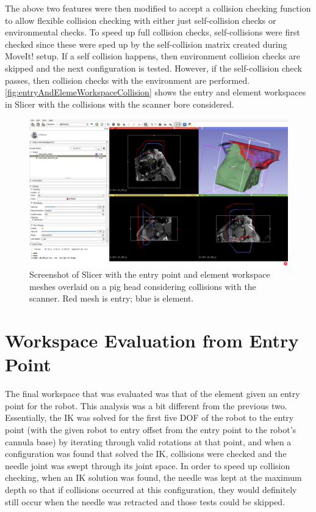 \documentclass[12pt]{report}
\begin{document}
The above two features were then modified to accept a collision checking function to allow flexible collision checking with either just self-collision checks or environmental checks. To speed up full collision checks, self-collisions were first checked since these were sped up by the self-collision matrix created during MoveIt! setup. If a self collision happens, then environment collision checks are skipped and the next configuration is tested. However, if the self-collision check passes, then collision checks with the environment are performed. \autoref{fig:entryAndElemeWorkspaceCollision} shows the entry and element workspaces in Slicer with the collisions with the scanner bore considered.

\begin{figure}[thpb]
	\centering
	\includegraphics[width=\textwidth]{images/slicer_entry_and_elem_with_bore.png}
    \caption{Screenshot of Slicer with the entry point and element workspace meshes overlaid on a pig head considering collisions with the scanner. Red mesh is entry; blue is element.}
    \label{fig:entryAndElemeWorkspaceCollision}
\end{figure}


\section{Workspace Evaluation from Entry Point}
The final workspace that was evaluated was that of the element given an entry point for the robot. This analysis was a bit different from the previous two. Essentially, the IK was solved for the first five DOF of the robot to the entry point (with the given robot to entry offset from the entry point to the robot's cannula base) by iterating through valid rotations at that point, and when a configuration was found that solved the IK, collisions were checked and the needle joint was swept through its joint space. In order to speed up collision checking, when an IK solution was found, the needle was kept at the maximum depth so that if collisions occurred at this configuration, they would definitely still occur when the needle was retracted and those tests could be skipped.
\end{document}
